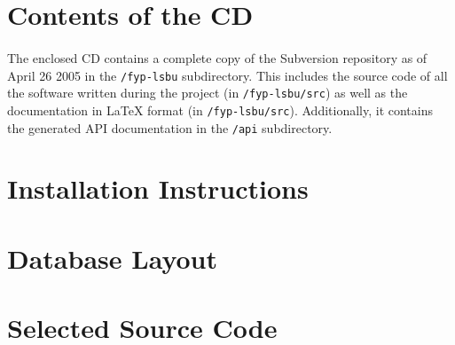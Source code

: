 \appendix
\appendixpage
\addappheadtotoc


\section{Contents of the CD}
\paragraph{}
The enclosed CD contains a complete copy of the Subversion repository as of April 26 2005 in the \texttt{/fyp-lsbu} subdirectory. This includes the source code of all the software written during the project (in \texttt{/fyp-lsbu/src}) as well as the documentation in \LaTeX{} format (in \texttt{/fyp-lsbu/src}). Additionally, it contains the generated API documentation in the \texttt{/api} subdirectory.

\section{Installation Instructions}
\subsection{}

\section{Database Layout}
\paragraph{}


\section{Selected Source Code}
